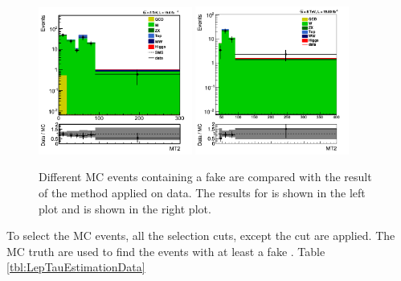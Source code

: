 \begin{figure}[!Hhtb]
\centering
\includegraphics[width=0.45\textwidth,keepaspectratio=true]{FakeRateMuTau/Estimation_ExtraLepExcl_SameSignWeightedHiggs.png}
\includegraphics[width=0.45\textwidth,keepaspectratio=true]{FakeRateEleTau/FREstimation.png}
\caption{Different MC events containing a fake \Tau are compared with the result of the method applied on data. The results for \muTau is shown in the left plot and \eTau is shown in the right plot.}
\label{fig:LepTauEstimationData}
\end{figure}
To select the MC events, all the selection cuts, except the \mttwo cut are applied. 
The MC truth are used to find the events with at least a fake \Tau. Table \ref{tbl:LepTauEstimationData}
